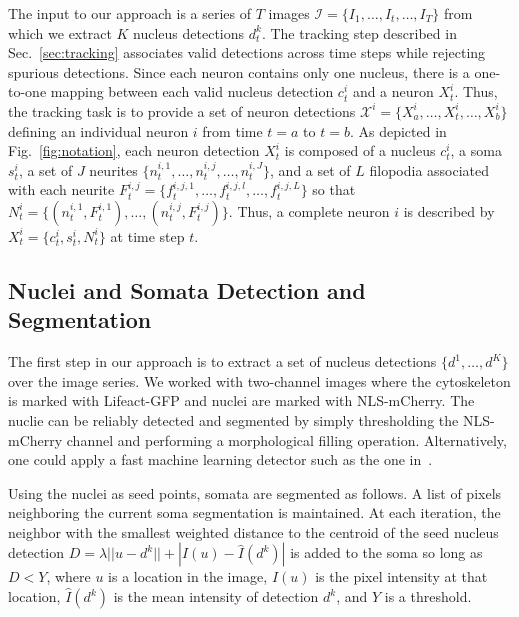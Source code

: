 
\vspace{-3mm}

The  input to  our approach  is a  series of  $T$ images  $\mathcal{I}  = \{I_1,
\ldots,  I_t,  \ldots, I_T\}$  from  which  we  extract $K$  nucleus  detections
$d_t^k$.   The  tracking step  described  in Sec.~\ref{sec:tracking}  associates
valid detections  across time steps  while rejecting spurious  detections. Since
each neuron  contains only  one nucleus, there  is a one-to-one  mapping between
each valid  nucleus detection $c_t^i$ and  a neuron $X_t^i$.  Thus, the tracking
task   is   to  provide   a   set   of   neuron  detections   $\mathcal{X}^i   =
\{X_{a}^i,\ldots,X_t^i,\ldots,X_{b}^i \}$ defining an individual neuron $i$ from
time  $t=a$  to $t=b$.   As  depicted  in  Fig.~\ref{fig:notation}, each  neuron
detection $X_t^i$ is composed of a nucleus $c_t^i$, a soma $s_t^i$, a set of $J$
neurites $\{n_t^{i,1},  \ldots, n_t^{i,j}, \ldots,  n_t^{i,J} \}$, and a  set of
$L$     filopodia    associated     with    each     neurite     $F_t^{i,j}    =
\{f_t^{i,j,1},\ldots,f_t^{i,j,l},\ldots,f_t^{i,j,L}  \}$ so  that  $N_t^i =  \{(
n_t^{i,1},F_t^{i,1}), \ldots,(n_t^{i,j},F_t^{i,j}) \}$.  Thus, a complete neuron
$i$ is described by $X_t^i = \{ c_t^i, s_t^i, N_t^i \}$ at time step $t$.


\vspace{-3mm}
\subsection{Nuclei and Somata Detection and Segmentation}
\vspace{-2mm}
\label{sec:detection}
The  first  step in  our  approach  is to  extract  a  set of  nucleus
detections $\{d^1,\ldots,d^K\}$ over the  image series. We worked with
two-channel  images where the  cytoskeleton  is marked  with
Lifeact-GFP and  nuclei   are   marked   with
NLS-mCherry. The nuclie can be reliably detected and segmented
by simply thresholding  the NLS-mCherry channel and performing  a morphological
filling operation.  Alternatively, one could apply
a  fast machine learning detector such  as the  one
in~\cite{Smith09}.


Using  the nuclei  as  seed points,   somata are  segmented as follows. 
A list of  pixels neighboring the
current  soma  segmentation is  maintained.   At  each iteration,  the
neighbor with  the smallest weighted  distance to the centroid  of the
seed  nucleus  detection  $D  =  \lambda  ||  u  -  d^k||  +  |I(u)  -
\hat{I}(d^k)|$ is added to the soma so long as $D < Y$, where $u$ is a
location  in the  image,  $I(u)$  is  the pixel  intensity at  that
location, $\hat{I}(d^k)$ is the mean intensity of detection $d^k$, and
$Y$ is a threshold.


